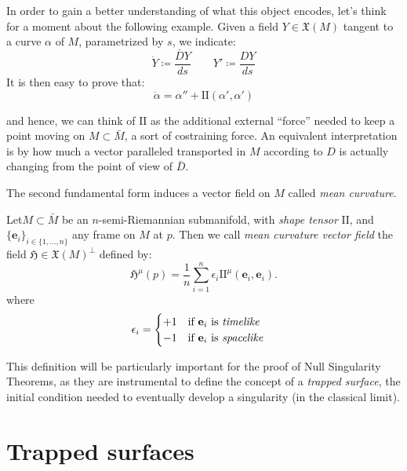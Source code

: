 In order to gain a better understanding of what this object encodes, let's think for a moment about the following example. Given a field \(Y \in \mathfrak{X}(M)\) tangent to a curve \(\alpha\) of \(M\), parametrized by \(s\), we indicate:
\[
\dot{Y} \coloneqq \frac{\bar{D}Y}{ds} \quad \quad Y' \coloneqq \frac{DY}{ds}
\]
It is then easy to prove that:
\[
\ddot{\alpha} = \alpha'' + \mathrm{I\!I}(\alpha', \alpha')
\]

and hence, we can think of \(\mathrm{I\!I}\) as the additional external ``force'' needed to keep a point moving on \(M \subset \bar{M}\), a sort of costraining force. An equivalent interpretation is by how much a vector paralleled transported in \(M\) according to \(D\) is actually changing from the point of view of \(\bar{D}\).



The second fundamental form induces a vector field on \(M\) called \emph{mean curvature}.
\begin{definition}
		Let\(M \subset \bar{M}\) be an  \(n\)-semi-Riemannian submanifold, with \emph{shape tensor} \(\mathrm{I\!I}\), and \(\{\textbf{e}_i\}_{i \in \{1, \ldots, n\}}\) any frame on \(M\) at \(p\). Then we call \emph{mean curvature vector field} the field \(\mathfrak{H} \in \mathfrak{X}(M)^{\perp} \) defined by:
		\[
		\mathfrak{H}^{\mu}(p) = \frac{1}{n} \sum_{i=1}^{n} \epsilon_i \mathrm{I\!I}^{\mu}(\textbf{e}_i, \textbf{e}_i).
		\]
		where 
		\[
		\epsilon_i = 
		\begin{cases}
		+1 \quad \text{if } \textbf{e}_i \text{ is \emph{timelike}} \\
		-1 \quad \text{if } \textbf{e}_i \text{ is \emph{spacelike}}
		\end{cases}
		\]
\end{definition}

This definition will be particularly important for the proof of Null Singularity Theorems, as they are instrumental to define the concept of a \emph{trapped surface}, the initial condition needed to eventually develop a singularity (in the classical limit). 

\section{Trapped surfaces}


